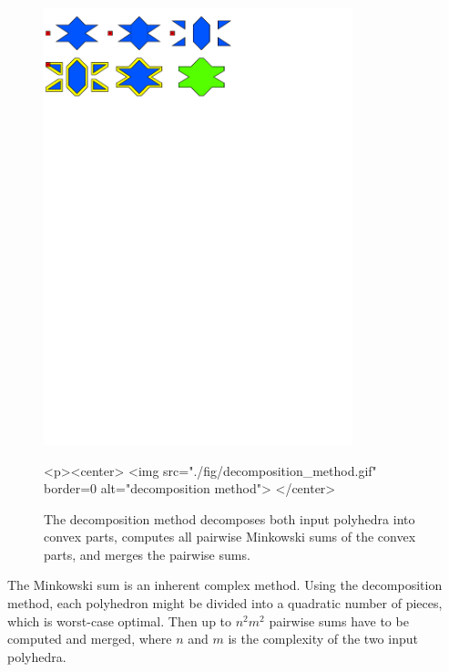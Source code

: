 \begin{figure}[t]
  \begin{ccTexOnly}
    \begin{center}
      \includegraphics[width=0.8\textwidth]{Minkowski_sum_3/fig/decomposition_method}
    \end{center}
  \end{ccTexOnly}
  \begin{ccHtmlOnly}
    <p><center>
    <img src="./fig/decomposition_method.gif" border=0 alt="decomposition method">
    </center>
  \end{ccHtmlOnly}
  \caption{The decomposition method decomposes both input polyhedra
           into convex parts, computes all pairwise Minkowski sums
           of the convex parts, and merges the pairwise sums.}
\end{figure}

The Minkowski sum is an inherent complex method. Using the
decomposition method, each polyhedron might be divided into a
quadratic number of pieces, which is worst-case optimal. Then up to
$n^2m^2$ pairwise sums have to be computed and merged, where $n$ and
$m$ is the complexity of the two input polyhedra.

